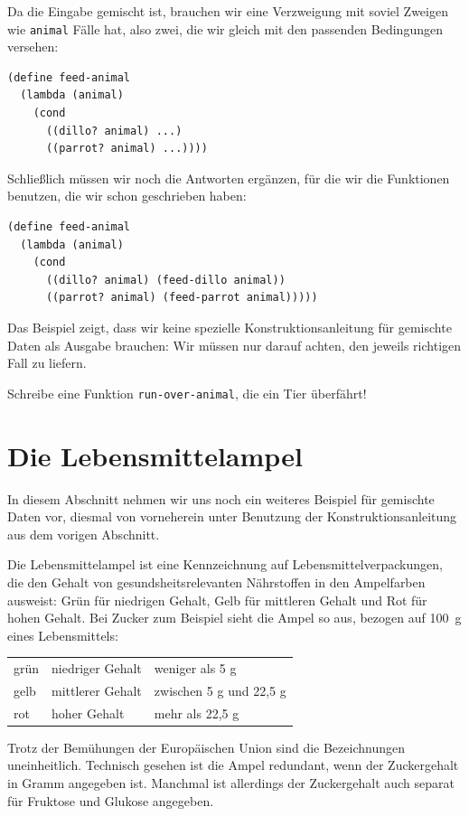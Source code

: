 %
Da die Eingabe gemischt ist, brauchen wir eine Verzweigung mit soviel
Zweigen wie \lstinline{animal} Fälle hat, also zwei, die wir gleich
mit den passenden Bedingungen versehen:
%
\begin{lstlisting}
(define feed-animal
  (lambda (animal)
    (cond
      ((dillo? animal) ...)
      ((parrot? animal) ...))))
\end{lstlisting}
%
Schließlich müssen wir noch die Antworten ergänzen, für die wir die
Funktionen benutzen, die wir schon geschrieben haben:
%
\begin{lstlisting}
(define feed-animal
  (lambda (animal)
    (cond
      ((dillo? animal) (feed-dillo animal))
      ((parrot? animal) (feed-parrot animal)))))
\end{lstlisting}
%
Das Beispiel zeigt, dass wir keine spezielle Konstruktionsanleitung
für gemischte Daten als Ausgabe brauchen: Wir müssen nur darauf
achten, den jeweils richtigen Fall zu liefern.
%
\begin{aufgabeinline}
  Schreibe eine Funktion \lstinline{run-over-animal}, die ein Tier
  überfährt!
\end{aufgabeinline}

\section{Die Lebensmittelampel}

%
In diesem Abschnitt nehmen wir uns noch ein weiteres Beispiel für
gemischte Daten vor, diesmal von vorneherein unter Benutzung der
Konstruktionsanleitung aus dem vorigen Abschnitt.

Die Lebensmittelampel ist eine Kennzeichnung auf Lebensmittelverpackungen,
die den Gehalt von gesundsheitsrelevanten Nährstoffen in den
Ampelfarben ausweist: Grün für niedrigen Gehalt, Gelb für mittleren Gehalt und
Rot für hohen Gehalt. Bei Zucker zum Beispiel sieht die Ampel so aus, bezogen
auf 100~g eines Lebensmittels:
%
\begin{center}
  \begin{tabular}{l|l|l}
    grün & niedriger Gehalt &  weniger als 5 g\\
    gelb & mittlerer Gehalt & zwischen 5 g und 22,5 g\\
    rot & hoher Gehalt & mehr als 22,5 g
  \end{tabular}
\end{center}
%
Trotz der Bemühungen der Europäischen Union sind die
Bezeichnungen uneinheitlich.  Technisch gesehen ist die Ampel
redundant, wenn der Zuckergehalt in Gramm angegeben ist.
Manchmal ist allerdings der Zuckergehalt auch separat für Fruktose und
Glukose angegeben.

